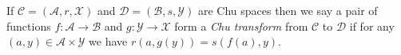 \documentclass[12pt]{article}
\begin{document}
If $\mathcal{C}=(\mathcal{A},r,\mathcal{X})$ and $\mathcal{D}=(\mathcal{B},s,\mathcal{Y})$ are Chu spaces then we say a pair of functions $f:\mathcal{A}\rightarrow\mathcal{B}$ and $g:\mathcal{Y}\rightarrow\mathcal{X}$ form a \emph{Chu transform} from $\mathcal{C}$ to $\mathcal{D}$ if for any $(a,y)\in \mathcal{A}\times\mathcal{Y}$ we have $r(a,g(y))=s(f(a),y)$.
\end{document}
